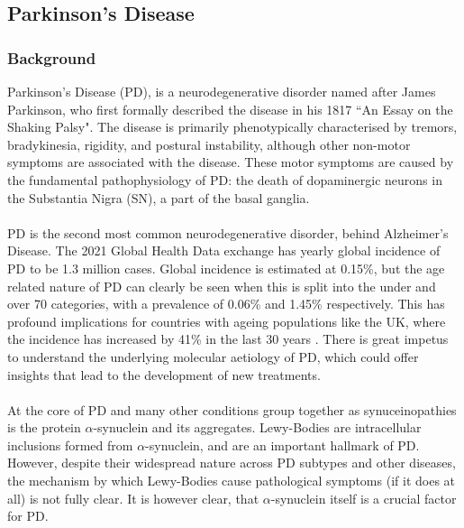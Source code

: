\documentclass{article}
\begin{document}
\subsection{Parkinson's Disease}
\subsubsection{Background}  
\label{subsubsec:Backround}
Parkinson's Disease (PD), is a neurodegenerative disorder named after James Parkinson, who first formally described the disease in his 1817 ``An Essay on the Shaking Palsy"\cite{Parkinson2002AnPalsy}. The disease is primarily phenotypically characterised by tremors, bradykinesia, rigidity, and postural instability, although other non-motor symptoms are associated with the disease. These motor symptoms are caused by the fundamental pathophysiology of PD: the death of dopaminergic neurons in the Substantia Nigra (SN), a part of the basal ganglia. 
\\
\\PD is the second most common neurodegenerative disorder, behind Alzheimer's Disease. The 2021 Global Health Data exchange\cite{Ferrari2024Global2021} has yearly global incidence of PD to be 1.3 million cases. Global incidence is estimated at 0.15\%, but the age related nature of PD can clearly be seen when this is split into the under and over 70 categories, with a prevalence of 0.06\% and 1.45\% respectively. This has profound implications for countries with ageing populations like the UK, where the incidence has increased by 41\% in the last 30 years \cite{Ferrari2024Global2021}. There is great impetus to understand the underlying molecular aetiology of PD, which could offer insights that lead to the development of new treatments.
\\
\\At the core of PD and many other conditions group together as synuceinopathies is the protein $\alpha$-synuclein and its aggregates. Lewy-Bodies are intracellular inclusions formed from $\alpha$-synuclein\cite{Spillantini1997-SynucleinBodies}, and are an important hallmark of PD. However, despite their widespread nature across PD subtypes and other diseases, the mechanism by which Lewy-Bodies cause pathological symptoms (if it does at all) is not fully clear\cite{Riederer2023LewyDisease}. It is however clear, that $\alpha$-synuclein itself is a crucial factor for PD.
\end{document}

